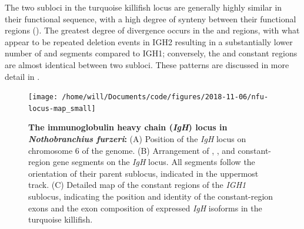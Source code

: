 	The two subloci in the turquoise killifish locus are generally highly similar in their functional sequence, with a high degree of synteny between their functional regions (). The greatest degree of divergence occurs in the \vh and \dh regions, with what appear to be repeated deletion events in IGH2 resulting in a substantially lower number of \vh and \dh segments compared to IGH1; conversely, the \jh and constant regions are almost identical between two subloci. These patterns are discussed in more detail in .
	
	
	\begin{figure}
	\centering
	\texttt{[image: /home/will/Documents/code/figures/2018-11-06/nfu-locus-map\_small]} %
			    \begin{subfigure}{0em}
        \label{fig:nfu-locus-map-a}
    \end{subfigure}
    \begin{subfigure}{0em}
        \label{fig:nfu-locus-map-b}
    \end{subfigure}
    \begin{subfigure}{0em}
        \label{fig:nfu-locus-map-c}
        \end{subfigure}
	\caption[The immunoglobulin heavy chain (\textit{IGH}) locus in \textit{Nothobranchius furzeri}]{\textbf{The immunoglobulin heavy chain (\textit{IgH}) locus in \textit{Nothobranchius furzeri}:} (A) Position of the \textit{IgH} locus on chromosome 6 of the \Nfu genome. (B) Arrangement of \vh, \dh, \jh and constant-region gene segments on the \Nfu \textit{IgH} locus. All segments follow the orientation of their parent sublocus, indicated in the uppermost track. (C) Detailed map of the constant regions of the \textit{IGH1} sublocus, indicating the position and identity of the constant-region exons and the exon composition of expressed \textit{IgH} isoforms in the turquoise killifish.}
	\label{fig:nfu-locus-map}
	\end{figure}
	
